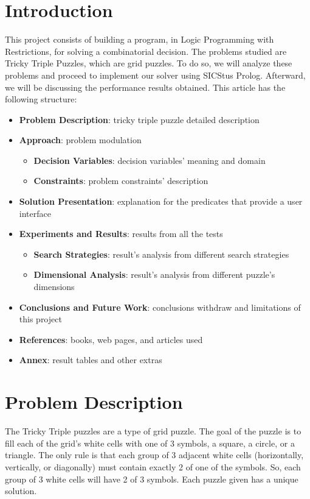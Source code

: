 \documentclass[runningheads]{llncs}
\begin{document}
\section{Introduction}
This project consists of building a program, in Logic Programming with Restrictions,
    for solving a combinatorial decision.
The problems studied are Tricky Triple Puzzles, which are grid puzzles. 
To do so, we will analyze these problems and proceed to implement our solver using SICStus Prolog.
Afterward, we will be discussing the performance results obtained.
This article has the following structure:
\begin{itemize}
    \item \textbf{Problem Description}: tricky triple puzzle detailed description
    \item \textbf{Approach}: problem modulation
        \begin{itemize}
            \item \textbf{Decision Variables}: decision variables' meaning and domain
            \item \textbf{Constraints}: problem constraints' description
        \end{itemize}
    \item \textbf{Solution Presentation}: explanation for the predicates that provide a user interface
    \item \textbf{Experiments and Results}: results from all the tests
        \begin{itemize}
            \item \textbf{Search Strategies}: result's analysis from different search strategies
            \item \textbf{Dimensional Analysis}: result's analysis from different puzzle's dimensions
        \end{itemize}
    \item \textbf{Conclusions and Future Work}: conclusions withdraw and limitations of this project
    \item \textbf{References}: books, web pages, and articles used
    \item \textbf{Annex}: result tables and other extras
\end{itemize}

\section{Problem Description}
The Tricky Triple puzzles are a type of grid puzzle.
The goal of the puzzle is to fill each of the grid’s white cells with one of 3 symbols,
a square, a circle, or a triangle.
The only rule is that each group of 3 adjacent white cells
    (horizontally, vertically, or diagonally) must contain exactly 2 of one of the symbols.
So, each group of 3 white cells will have 2 of 3 symbols.
Each puzzle given has a unique solution.
\end{document}
